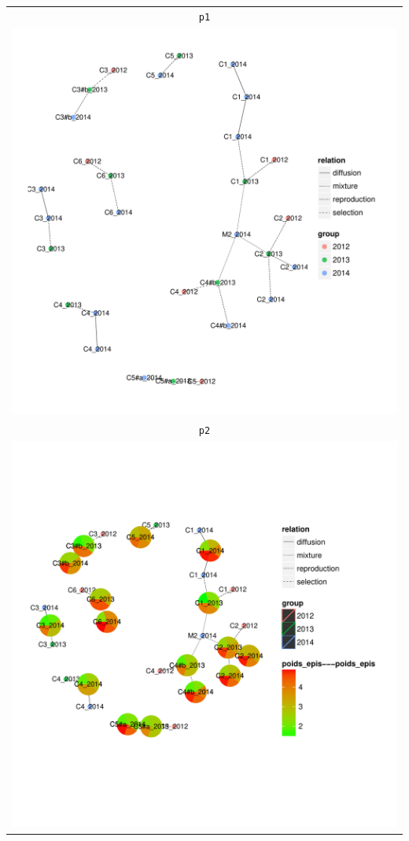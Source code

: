 \documentclass{article}\usepackage[]{graphicx}\usepackage[]{color}
\newenvironment{knitrout}{}{} %
\begin{document}
\begin{itemize}
\begin{itemize}
\begin{center}
\begin{tabular}{c}
\texttt{p1}\\
\begin{knitrout}
\definecolor{shadecolor}{rgb}{0.969, 0.969, 0.969}\color{fgcolor}

{\centering \includegraphics[width=.6\textwidth]{figures/shinemas2R_unnamed-chunk-81-1} 

}



\end{knitrout}
\\
\texttt{p2}\\
\begin{knitrout}
\definecolor{shadecolor}{rgb}{0.969, 0.969, 0.969}\color{fgcolor}

{\centering \includegraphics[width=.8\textwidth]{figures/shinemas2R_unnamed-chunk-82-1} 

}
\end{knitrout}
\end{tabular}
\end{center}
\end{itemize}
\end{itemize}
\end{document}
